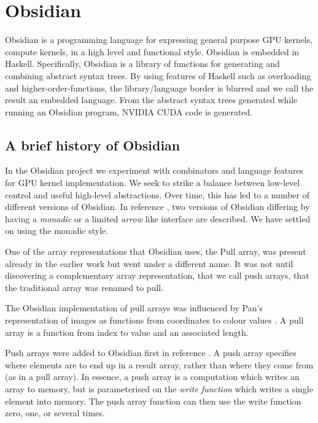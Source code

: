 \section{Obsidian} 
\label{sec:Obsidian} 

Obsidian is a programming language for expressing general purpose 
GPU kernels, compute kernels, in a high level and functional style.  
Obsidian is embedded in Haskell.
Specifically, Obsidian is a library of functions for generating 
and combining abstract syntax trees.
By using features of Haskell such as overloading and higher-order-functions, 
the library/language border is blurred and we call the result an embedded 
language. From the abstract syntax trees generated while running an 
Obsidian program, NVIDIA CUDA code is generated. 


\subsection{A brief history of Obsidian} 
\label{sec:OBSHist}

In the Obsidian project we experiment with combinators and language 
features for GPU kernel implementation. We seek to strike a balance 
between low-level control and useful high-level abstractions. Over time, this 
has led to a number of different versions of Obsidian. In reference \cite{JSLIC}, 
two versions of Obsidian differing by having a {\em monadic} or a limited {\em arrow} 
like interface are described. We have settled on using the monadic style. 

One of the array representations that Obsidian uses, the Pull array, was present already 
in the earlier work but went under a different name. It was not until discovering 
a complementary array representation, that we call push arrays, that the traditional 
array was renamed to pull. 

The Obsidian implementation of pull arrays was influenced by Pan's representation 
of images as functions from coordinates to colour values \cite{ELLIJFP}. A pull array 
is a function from index to value and an associated length.  

Push arrays were added to Obsidian first in reference \cite{PUSH}. A push array
specifies where elements are to end up in a result array, rather than where 
they come from (as in a pull array). In essence, a push array is a
computation which writes an array to memory, but is parameterised on
the {\em write function} which writes a single element into memory.
The push array function can then 
use the write function zero, one, or several times. 

